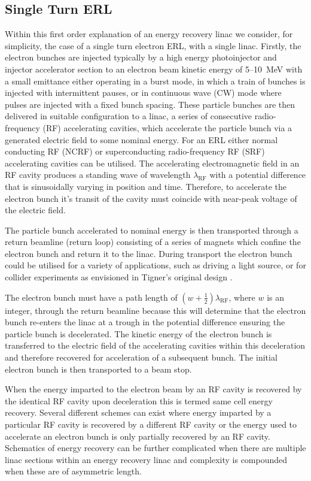 \documentclass[../main.tex]{subfiles}
\begin{document}
\subsection{Single Turn ERL}

Within this first order explanation of an energy recovery linac we consider, for simplicity, the case of a single turn electron ERL, with a single linac. Firstly, the electron bunches are injected typically by a high energy photoinjector and injector accelerator section to an electron beam kinetic energy of 5--10~\si{\mega\electronvolt} with a small emittance either operating in a burst mode, in which a train of bunches is injected with intermittent pauses, or in continuous wave (CW) mode where pulses are injected with a fixed bunch spacing. These particle bunches are then delivered in suitable configuration to a linac, a series of consecutive radio-frequency (RF) accelerating cavities, which accelerate the particle bunch via a generated electric field to some nominal energy. For an ERL either normal conducting RF (NCRF) or superconducting radio-frequency RF (SRF) accelerating cavities can be utilised. The accelerating electromagnetic field in an RF cavity produces a standing wave of wavelength $\lambda_{\mathrm{RF}}$ with a potential difference that is sinusoidally varying in position and time. Therefore, to accelerate the electron bunch it's transit of the cavity must coincide with near-peak voltage of the electric field.   

The particle bunch accelerated to nominal energy is then transported through a return beamline (return loop) consisting of a series of magnets which confine the electron bunch and return it to the linac. During transport the electron bunch could be utilised for a variety of applications, such as driving a light source, or for collider experiments as envisioned in Tigner's original design \cite{tigner1965possible}.

The electron bunch must have a path length of $\left(w+\frac{1}{2}\right)\lambda_{\mathrm{RF}}$, where $w$ is an integer, through the return beamline because this will determine that the electron bunch re-enters the linac at a trough in the potential difference ensuring the particle bunch is decelerated. The kinetic energy of the electron bunch is transferred to the electric field of the accelerating cavities within this deceleration and therefore recovered for acceleration of a subsequent bunch. The initial electron bunch is then transported to a beam stop.

When the energy imparted to the electron beam by an RF cavity is recovered by the identical RF cavity upon deceleration this is termed same cell energy recovery. Several different schemes can exist where energy imparted by a particular RF cavity is recovered by a different RF cavity or the energy used to accelerate an electron bunch is only partially recovered by an RF cavity. Schematics of energy recovery can be further complicated when there are multiple linac sections within an energy recovery linac and complexity is compounded when these are of asymmetric length.     
\end{document}
